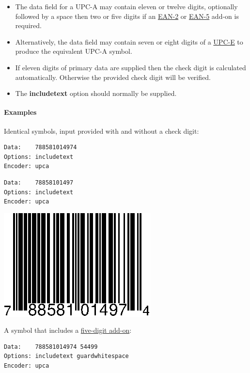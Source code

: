 \begin{itemize}
\tightlist
\item
  The data field for a UPC-A may contain eleven or twelve digits,
  optionally followed by a space then two or five digits if an
  \protect\hyperlink{ean-2}{EAN-2} or \protect\hyperlink{ean-5}{EAN-5}
  add-on is required.
\item
  Alternatively, the data field may contain seven or eight digits of a
  \protect\hyperlink{upc-e}{UPC-E} to produce the equivalent UPC-A
  symbol.
\item
  If eleven digits of primary data are supplied then the check digit is
  calculated automatically. Otherwise the provided check digit will be
  verified.
\item
  The \textbf{includetext} option should normally be supplied.
\end{itemize}

\hypertarget{examples-2}{%
\paragraph{Examples}\label{examples-2}}

Identical symbols, input provided with and without a check digit:

\begin{verbatim}
Data:    788581014974
Options: includetext
Encoder: upca
\end{verbatim}

\begin{verbatim}
Data:    78858101497
Options: includetext
Encoder: upca
\end{verbatim}

\includegraphics{images/upca-1.eps}

A symbol that includes a \protect\hyperlink{ean-5}{five-digit add-on}:

\begin{verbatim}
Data:    788581014974 54499
Options: includetext guardwhitespace
Encoder: upca
\end{verbatim}

